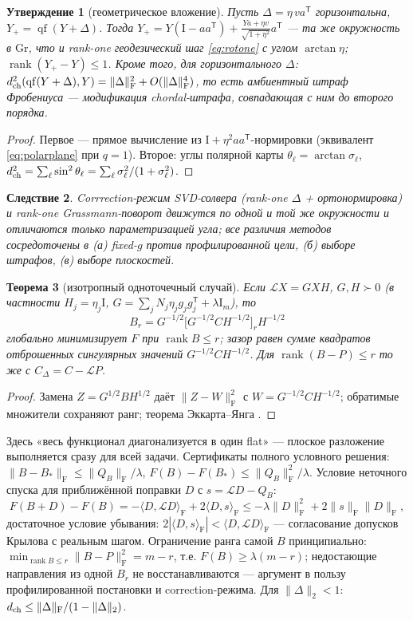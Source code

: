 \documentclass[11pt,a4paper]{article}
\newcommand{\Id}{\mathrm I}
\newcommand{\T}{^{\mathsf T}}
\newcommand{\F}{_{\mathrm F}}
\newcommand{\ip}[2]{\langle #1,#2\rangle_{\mathrm F}}
\newcommand{\Gr}{\mathrm{Gr}}
\newcommand{\qf}{\operatorname{qf}}
\DeclareMathOperator{\rank}{rank}
\newtheorem{theorem}{Теорема}[section]
\newtheorem{proposition}[theorem]{Утверждение}
\newtheorem{corollary}[theorem]{Следствие}
\theoremstyle{remark}
\begin{document}
\begin{proposition}[геометрическое вложение]\label{prop:embedding}
Пусть $\Delta=\eta\,va\T$ горизонтальна, $Y_+=\qf(Y+\Delta)$. Тогда
 $Y_+=Y(\Id-aa\T)+\tfrac{Ya+\eta v}{\sqrt{1+\eta^2}}a\T$ ---
та же окружность в $\Gr$, что и rank-one геодезический шаг
\eqref{eq:rotone} с углом $\arctan\eta$; $\rank(Y_+-Y)\le1$.
Кроме того, для горизонтального $\Delta$:
 $d_{\rm ch}^2(\qf(Y+\Delta),Y)=\|\Delta\|\F^2+O(\|\Delta\|\F^4)$,
то есть амбиентный штраф Фробениуса --- модификация chordal-штрафа,
совпадающая с ним до второго порядка.
\end{proposition}
\begin{proof}
Первое --- прямое вычисление из $\Id+\eta^2aa\T$-нормировки
(эквивалент \eqref{eq:polarplane} при $q=1$). Второе:
углы полярной карты $\theta_\ell=\arctan\sigma_\ell$,
 $d_{\rm ch}^2=\sum_\ell\sin^2\theta_\ell=\sum_\ell\sigma_\ell^2/(1+\sigma_\ell^2)$.
\end{proof}

\begin{corollary}
Corrrection-режим SVD-солвера (rank-one $\Delta$ + ортонормировка) и
rank-one Grassmann-поворот движутся по одной и той же окружности и
отличаются только параметризацией угла; все различия методов сосредоточены
в (а) fixed-$g$ против профилированной цели, (б) выборе штрафов,
(в) выборе плоскостей.
\end{corollary}

\begin{theorem}[изотропный одноточечный случай]\label{thm:iso}
Если $\mathcal LX=GXH$, $G,H\succ0$ (в частности
 $H_j=\eta_j\Id$, $G=\sum_jN_j\eta_jg_jg_j\T+\lambda\Id_m$), то
\begin{equation}\label{eq:isoopt}
 B_r=G^{-1/2}\bigl[G^{-1/2}CH^{-1/2}\bigr]_rH^{-1/2}
\end{equation}
глобально минимизирует $F$ при $\rank B\le r$; зазор равен сумме квадратов
отброшенных сингулярных значений $G^{-1/2}CH^{-1/2}$. Для
 $\rank(B-P)\le r$ то же с $C_\Delta=C-\mathcal LP$.
\end{theorem}
\begin{proof}
Замена $Z=G^{1/2}BH^{1/2}$ даёт $\|Z-W\|\F^2$ с
 $W=G^{-1/2}CH^{-1/2}$; обратимые множители сохраняют ранг; теорема
Эккарта--Янга \cite{eckart}.
\end{proof}

Здесь «весь функционал диагонализуется в один flat» --- плоское разложение
выполняется сразу для всей задачи. Сертификаты полного условного решения:
 $\|B-B_*\|\F\le\|Q_B\|\F/\lambda$,
 $F(B)-F(B_*)\le\|Q_B\|\F^2/\lambda$. Условие неточного спуска для
приближённой поправки $D$ с $s=\mathcal LD-Q_B$:
\begin{equation}\label{eq:inexact}
 F(B+D)-F(B)=-\ip{D}{\mathcal LD}+2\ip{D}{s}
 \le-\lambda\|D\|\F^2+2\|s\|\F\|D\|\F,
\end{equation}
достаточное условие убывания: $2|\ip{D}{s}|<\ip{D}{\mathcal LD}$ ---
согласование допусков Крылова с реальным шагом. Ограничение ранга самой
 $B$ принципиально: $\min_{\rank B\le r}\|B-P\|\F^2=m-r$, т.е.
 $F(B)\ge\lambda(m-r)$; недостающие направления из одной $B_r$ не
восстанавливаются --- аргумент в пользу профилированной постановки и
correction-режима. Для $\|\Delta\|_2<1$:
 $d_{\rm ch}\le\|\Delta\|\F/(1-\|\Delta\|_2)$.
\end{document}
